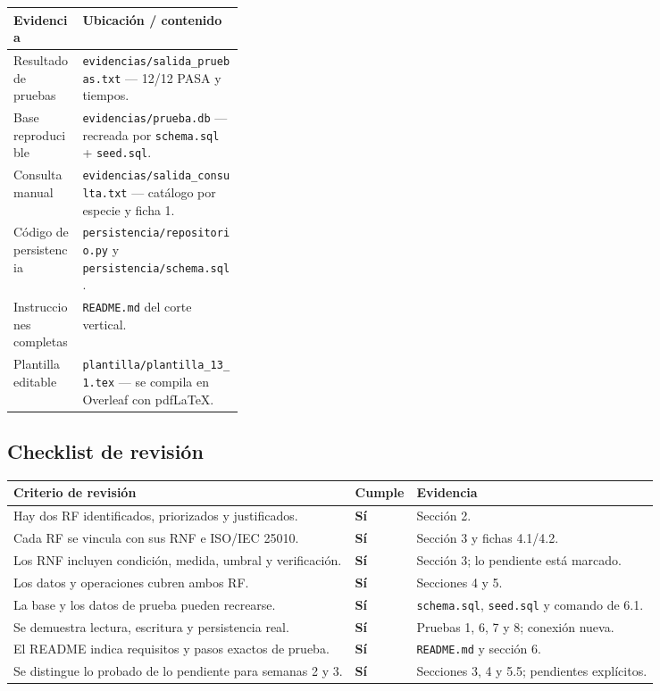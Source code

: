 \documentclass[11pt,a4paper]{article}
\newcommand{\code}[1]{\texttt{#1}}
\newcommand{\thead}[1]{\textbf{#1}}
\begin{document}
{\footnotesize
\begin{tabularx}{\linewidth}{@{}L{0.30\linewidth}Y@{}}
\toprule
\thead{Evidencia} & \thead{Ubicación / contenido} \\ \midrule
Resultado de pruebas & \code{evidencias/salida\_pruebas.txt} --- 12/12 PASA y tiempos. \\
Base reproducible & \code{evidencias/prueba.db} --- recreada por \code{schema.sql} + \code{seed.sql}. \\
Consulta manual & \code{evidencias/salida\_consulta.txt} --- catálogo por especie y ficha 1. \\
Código de persistencia & \code{persistencia/repositorio.py} y \code{persistencia/schema.sql}. \\
Instrucciones completas & \code{README.md} del corte vertical. \\
Plantilla editable & \code{plantilla/plantilla\_13\_1.tex} --- se compila en Overleaf con pdfLaTeX. \\
\bottomrule
\end{tabularx}
}

\subsection{Checklist de revisión}

{\footnotesize
\begin{tabularx}{\linewidth}{@{}V{1.9}Z{0.35}V{0.75}@{}}
\toprule

\thead{Criterio de revisión} & \thead{Cumple} & \thead{Evidencia} \\ \midrule

Hay dos RF identificados, priorizados y justificados. & \textbf{Sí} & Sección 2. \\
Cada RF se vincula con sus RNF e ISO/IEC 25010. & \textbf{Sí} & Sección 3 y fichas 4.1/4.2. \\
Los RNF incluyen condición, medida, umbral y verificación. & \textbf{Sí} & Sección 3; lo pendiente está marcado. \\
Los datos y operaciones cubren ambos RF. & \textbf{Sí} & Secciones 4 y 5. \\
La base y los datos de prueba pueden recrearse. & \textbf{Sí} & \code{schema.sql}, \code{seed.sql} y comando de 6.1. \\
Se demuestra lectura, escritura y persistencia real. & \textbf{Sí} & Pruebas 1, 6, 7 y 8; conexión nueva. \\
El README indica requisitos y pasos exactos de prueba. & \textbf{Sí} & \code{README.md} y sección 6. \\
Se distingue lo probado de lo pendiente para semanas 2 y 3. & \textbf{Sí} & Secciones 3, 4 y 5.5; pendientes explícitos. \\
\bottomrule
\end{tabularx}
}
\end{document}
